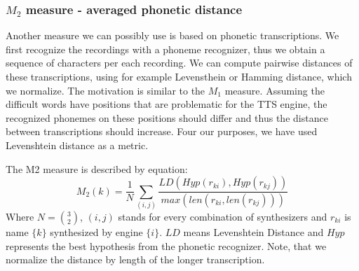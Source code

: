 \subsubsection{$M_2$ measure - averaged phonetic distance}
Another measure we can possibly use is based on phonetic transcriptions. We first recognize the recordings with a phoneme recognizer, thus we obtain a sequence of characters per each recording. We can compute pairwise distances of these transcriptions, using for example Levensthein \cite{navarro2001guided} or Hamming distance, which we normalize. The motivation is similar to the $M_1$ measure. Assuming the difficult words have positions that are problematic for the TTS engine, the recognized phonemes on these positions should differ and thus the distance between transcriptions should increase. Four our purposes, we have used Levenshtein distance as a metric.
\par
The M2 measure is described by equation:
\begin{equation}
M_2(k) = \frac{1}{N}\sum_{(i,j)}{\frac{LD(Hyp(r_{ki}),Hyp(r_{kj}))}{max(len(r_{ki},len(r_{kj})))}}
\end{equation}
Where $N = {3\choose2}$, $(i,j)$ stands for every combination of synthesizers and $r_{ki}$ is name $\{k\}$ synthesized by engine $\{i\}$. $LD$ means Levenshtein Distance and $Hyp$ represents the best hypothesis from the phonetic recognizer. Note, that we normalize the distance by length of the longer transcription.

